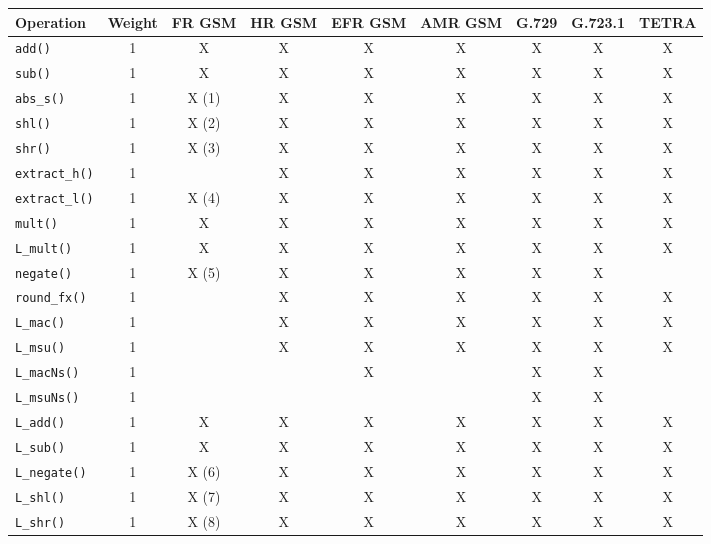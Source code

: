 \begin{table}[th]
    \begin{center}
        \footnotesize
        \begin{tabular}{|l|c|c|c|c|c|c|c|c|}
            \hline
            Operation &Weight &FR GSM &HR GSM &EFR GSM &AMR GSM &G.729 &G.723.1 &TETRA\\
            \hline \hline
            {\tt add()}     &1 &X &X &X &X &X &X &X\\
            {\tt sub()}     &1 &X &X &X &X &X &X &X\\
            {\tt abs\_s()}  &1 &X (1) &X &X &X &X &X &X\\
            {\tt shl()}     &1 &X (2) &X &X &X &X &X &X\\
            {\tt shr()}     &1 &X (3) &X &X &X &X &X &X\\
            {\tt extract\_h()}      &1 & &X &X &X &X &X &X\\
            {\tt extract\_l()}      &1 &X (4) &X &X &X &X &X &X\\
            {\tt mult()}    &1 &X &X &X &X &X &X &X\\
            {\tt L\_mult()} &1 &X &X &X &X &X &X &X\\
            {\tt negate()}  &1 &X (5) &X &X &X &X &X & \\
            {\tt round\_fx()}   &1 & &X &X &X &X &X &X\\
            {\tt L\_mac()}  &1 & &X &X &X &X &X &X\\
            {\tt L\_msu()}  &1 & &X &X &X &X &X &X\\
            {\tt L\_macNs()}        &1 & & &X & &X &X & \\
            {\tt L\_msuNs()}        &1 & & & & &X &X & \\
            {\tt L\_add()}  &1 &X &X &X &X &X &X &X\\
            {\tt L\_sub()}  &1 &X &X &X &X &X &X &X\\
            {\tt L\_negate()}       &1 &X (6) &X &X &X &X &X &X\\
            {\tt L\_shl()}  &1 &X (7) &X &X &X &X &X &X\\
            {\tt L\_shr()}  &1 &X (8) &X &X &X &X &X &X\\

\end{tabular}
\end{center}
\end{table}
